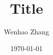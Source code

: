 \documentclass{article}
\begin{document}
\title{Title}
\author{Wenhao Zhang}
\date{\today}
\maketitle





\printbibliography[title={Reference}]
\end{document}
